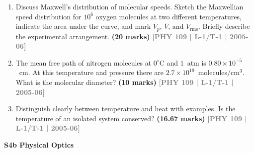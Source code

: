 \documentclass[12pt,a3paper]{article}
\newcommand{\yr}[1]{\hfill\textcolor{gray}{\small\textbf{[#1]}}}
\newcommand{\mk}[1]{\textcolor{orange!70!black}{\small\textbf{(#1 marks)}}}
\newcommand{\subtopic}[2]{%
  \vspace{10pt}
  \noindent\begin{tcolorbox}[colback=#1!8,colframe=#1,boxrule=0.6pt,arc=4pt,
    left=6pt,right=6pt,top=4pt,bottom=4pt]
    \small\bfseries\textcolor{#1}{#2}
  \end{tcolorbox}
  \vspace{2pt}
}
\begin{document}
\begin{enumerate}
\item Discuss Maxwell's distribution of molecular speeds. Sketch the Maxwellian speed distribution for $10^6$ oxygen molecules at two different temperatures, indicate the area under the curve, and mark $V_p$, $\bar{V}$, and $V_\text{rms}$. Briefly describe the experimental arrangement.
\mk{20} \yr{PHY 109 | L-1/T-1 | 2005-06}

\item The mean free path of nitrogen molecules at $0^\circ$C and $1$~atm is $0.80\times10^{-5}$~cm. At this temperature and pressure there are $2.7\times10^{19}$~molecules/cm$^3$. What is the molecular diameter?
\mk{10} \yr{PHY 109 | L-1/T-1 | 2005-06}

\item Distinguish clearly between temperature and heat with examples. Is the temperature
of an isolated system conserved? 
\mk{16.67} \yr{PHY 109 | L-1/T-1 | 2005-06}


\end{enumerate}

\label{sec:s4b}
\subtopic{cA}{S4b \quad Physical Optics}
\end{document}
